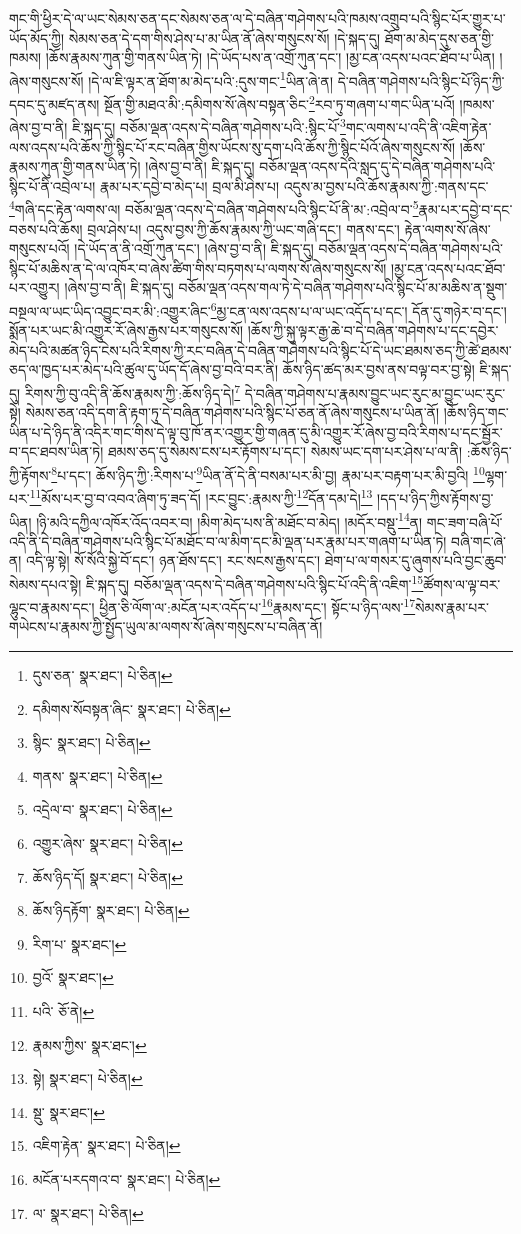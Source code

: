 གང་གི་ཕྱིར་དེ་ལ་ཡང་སེམས་ཅན་དང་སེམས་ཅན་ལ་དེ་བཞིན་གཤེགས་པའི་ཁམས་འགྲུབ་པའི་སྙིང་པོར་གྱུར་པ་ཡོད་མོད་ཀྱི། སེམས་ཅན་དེ་དག་གིས་ཤེས་པ་མ་ཡིན་ནོ་ཞེས་གསུངས་སོ། །དེ་སྐད་དུ། ཐོག་མ་མེད་དུས་ཅན་གྱི་ཁམས། །ཆོས་རྣམས་ཀུན་གྱི་གནས་ཡིན་ཏེ། །དེ་ཡོད་པས་ན་འགྲོ་ཀུན་དང་། །མྱ་ངན་འདས་པའང་ཐོབ་པ་ཡིན། །ཞེས་གསུངས་སོ། །དེ་ལ་ཇི་ལྟར་ན་ཐོག་མ་མེད་པའི་:དུས་གང་\footnote{དུས་ཅན་  སྣར་ཐང་།  པེ་ཅིན། }ཡིན་ཞེ་ན། དེ་བཞིན་གཤེགས་པའི་སྙིང་པོ་ཉིད་ཀྱི་དབང་དུ་མཛད་ནས། སྔོན་གྱི་མཐའ་མི་:དམིགས་སོ་ཞེས་བསྟན་ཅིང་\footnote{དམིགས་སོབསྟན་ཞིང་  སྣར་ཐང་།  པེ་ཅིན། }རབ་ཏུ་གཞག་པ་གང་ཡིན་པའོ། །ཁམས་ཞེས་བྱ་བ་ནི། ཇི་སྐད་དུ། བཅོམ་ལྡན་འདས་དེ་བཞིན་གཤེགས་པའི་:སྙིང་པོ་\footnote{སྙིང་  སྣར་ཐང་།  པེ་ཅིན། }གང་ལགས་པ་འདི་ནི་འཇིག་རྟེན་ལས་འདས་པའི་ཆོས་ཀྱི་སྙིང་པོ་རང་བཞིན་གྱིས་ཡོངས་སུ་དག་པའི་ཆོས་ཀྱི་སྙིང་པོའོ་ཞེས་གསུངས་སོ། །ཆོས་རྣམས་ཀུན་གྱི་གནས་ཡིན་ཏེ། །ཞེས་བྱ་བ་ནི། ཇི་སྐད་དུ། བཅོམ་ལྡན་འདས་དེའི་སླད་དུ་དེ་བཞིན་གཤེགས་པའི་སྙིང་པོ་ནི་འབྲེལ་པ། རྣམ་པར་དབྱེ་བ་མེད་པ། བྲལ་མི་ཤེས་པ། འདུས་མ་བྱས་པའི་ཆོས་རྣམས་ཀྱི་:གནས་དང་\footnote{གནས་  སྣར་ཐང་།  པེ་ཅིན། }གཞི་དང་རྟེན་ལགས་ལ། བཅོམ་ལྡན་འདས་དེ་བཞིན་གཤེགས་པའི་སྙིང་པོ་ནི་མ་:འབྲེལ་བ་\footnote{འདྲེལ་བ་  སྣར་ཐང་།  པེ་ཅིན། }རྣམ་པར་དབྱེ་བ་དང་བཅས་པའི་ཆོས། བྲལ་ཤེས་པ། འདུས་བྱས་ཀྱི་ཆོས་རྣམས་ཀྱི་ཡང་གཞི་དང་། གནས་དང་། རྟེན་ལགས་སོ་ཞེས་གསུངས་པའོ། །དེ་ཡོད་ན་ནི་འགྲོ་ཀུན་དང་། །ཞེས་བྱ་བ་ནི། ཇི་སྐད་དུ། བཅོམ་ལྡན་འདས་དེ་བཞིན་གཤེགས་པའི་སྙིང་པོ་མཆིས་ན་དེ་ལ་འཁོར་བ་ཞེས་ཚིག་གིས་བཏགས་པ་ལགས་སོ་ཞེས་གསུངས་སོ། །མྱ་ངན་འདས་པའང་ཐོབ་པར་འགྱུར། །ཞེས་བྱ་བ་ནི། ཇི་སྐད་དུ། བཅོམ་ལྡན་འདས་གལ་ཏེ་དེ་བཞིན་གཤེགས་པའི་སྙིང་པོ་མ་མཆིས་ན་སྡུག་བསྔལ་ལ་ཡང་ཡིད་འབྱུང་བར་མི་:འགྱུར་ཞིང་\footnote{འགྱུར་ཞེས་  སྣར་ཐང་།  པེ་ཅིན། }མྱ་ངན་ལས་འདས་པ་ལ་ཡང་འདོད་པ་དང་། དོན་དུ་གཉེར་བ་དང་། སྨོན་པར་ཡང་མི་འགྱུར་རོ་ཞེས་རྒྱས་པར་གསུངས་སོ། །ཆོས་ཀྱི་སྐུ་ལྟར་རྒྱ་ཆེ་བ་དེ་བཞིན་གཤེགས་པ་དང་དབྱེར་མེད་པའི་མཚན་ཉིད་ངེས་པའི་རིགས་ཀྱི་རང་བཞིན་དེ་བཞིན་གཤེགས་པའི་སྙིང་པོ་དེ་ཡང་ཐམས་ཅད་ཀྱི་ཚེ་ཐམས་ཅད་ལ་ཁྱད་པར་མེད་པའི་ཚུལ་དུ་ཡོད་དོ་ཞེས་བྱ་བའི་བར་ནི། ཆོས་ཉིད་ཚད་མར་བྱས་ནས་བལྟ་བར་བྱ་སྟེ། ཇི་སྐད་དུ། རིགས་ཀྱི་བུ་འདི་ནི་ཆོས་རྣམས་ཀྱི་:ཆོས་ཉིད་དེ།\footnote{ཆོས་ཉིད་དོ།  སྣར་ཐང་།  པེ་ཅིན། } དེ་བཞིན་གཤེགས་པ་རྣམས་བྱུང་ཡང་རུང་མ་བྱུང་ཡང་རུང་སྟེ། སེམས་ཅན་འདི་དག་ནི་རྟག་ཏུ་དེ་བཞིན་གཤེགས་པའི་སྙིང་པོ་ཅན་ནོ་ཞེས་གསུངས་པ་ཡིན་ནོ། །ཆོས་ཉིད་གང་ཡིན་པ་དེ་ཉིད་ནི་འདིར་གང་གིས་དེ་ལྟ་བུ་ཁོ་ནར་འགྱུར་གྱི་གཞན་དུ་མི་འགྱུར་རོ་ཞེས་བྱ་བའི་རིགས་པ་དང་སྦྱོར་བ་དང་ཐབས་ཡིན་ཏེ། ཐམས་ཅད་དུ་སེམས་ངས་པར་རྟོགས་པ་དང་། སེམས་ཡང་དག་པར་ཤེས་པ་ལ་ནི། :ཆོས་ཉིད་ཀྱི་རྟོགས་\footnote{ཆོས་ཉིདརྟོག་  སྣར་ཐང་།  པེ་ཅིན། }པ་དང་། ཆོས་ཉིད་ཀྱི་:རིགས་པ་\footnote{རིག་པ་  སྣར་ཐང་། }ཡིན་ནོ་དེ་ནི་བསམ་པར་མི་བྱ། རྣམ་པར་བརྟག་པར་མི་བྱའི། \footnote{བྱའོ་  སྣར་ཐང་། }ལྷག་པར་\footnote{པའི་  ཅོ་ནེ། }མོས་པར་བྱ་བ་འབའ་ཞིག་ཏུ་ཟད་དོ། །རང་བྱུང་:རྣམས་ཀྱི་\footnote{རྣམས་ཀྱིས་  སྣར་ཐང་། }དོན་དམ་དེ།\footnote{སྟེ།  སྣར་ཐང་།  པེ་ཅིན། } །དད་པ་ཉིད་ཀྱིས་རྟོགས་བྱ་ཡིན། །ཉི་མའི་དཀྱིལ་འཁོར་འོད་འབར་བ། །མིག་མེད་པས་ནི་མཐོང་བ་མེད། །མདོར་བསྡུ་\footnote{སྡུ་  སྣར་ཐང་། }ན། གང་ཟག་བཞི་པོ་འདི་ནི་དེ་བཞིན་གཤེགས་པའི་སྙིང་པོ་མཐོང་བ་ལ་མིག་དང་མི་ལྡན་པར་རྣམ་པར་གཞག་པ་ཡིན་ཏེ། བཞི་གང་ཞེ་ན། འདི་ལྟ་སྟེ། སོ་སོའི་སྐྱེ་བོ་དང་། ཉན་ཐོས་དང་། རང་སངས་རྒྱས་དང་། ཐེག་པ་ལ་གསར་དུ་ཞུགས་པའི་བྱང་ཆུབ་སེམས་དཔའ་སྟེ། ཇི་སྐད་དུ། བཅོམ་ལྡན་འདས་དེ་བཞིན་གཤེགས་པའི་སྙིང་པོ་འདི་ནི་འཇིག་\footnote{འཇིག་རྟེན་  སྣར་ཐང་།  པེ་ཅིན། }ཚོགས་ལ་ལྟ་བར་ལྷུང་བ་རྣམས་དང་། ཕྱིན་ཅི་ལོག་ལ་:མངོན་པར་འདོད་པ་\footnote{མངོན་པརདགའ་བ་  སྣར་ཐང་།  པེ་ཅིན། }རྣམས་དང་། སྟོང་པ་ཉིད་ལས་\footnote{ལ་  སྣར་ཐང་།  པེ་ཅིན། }སེམས་རྣམ་པར་གཡེངས་པ་རྣམས་ཀྱི་སྤྱོད་ཡུལ་མ་ལགས་སོ་ཞེས་གསུངས་པ་བཞིན་ནོ། 